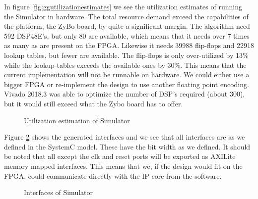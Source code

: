 In figure \ref{fig:ggutilizationestimates} we see the utilization estimates of running the Simulator in hardware. The total resource demand exceed the capabilities of the platform, the ZyBo board, by quite a significant margin. The algorithm need 592 DSP48E's, but only 80 are available, which means that it needs over 7 times as many as are present on the FPGA. Likewise it needs 39988 flip-flops and 22918 lookup tables, but fewer are available. The flip-flops is only over-utilized by 13\% while the lookup-tables exceeds the available ones by 30\%. This means that the current implementation will not be runnable on hardware. We could either use a bigger FPGA or re-implement the design to use another floating point encoding. Vivado 2018.3 was able to optimize the number of DSP's required (about 300), but it would still exceed what the Zybo board has to offer.

\begin{figure}[h!]
	\centering
	\caption{Utilization estimation of Simulator}
	\label{fig:simutilizationestimates}
\end{figure}

Figure \ref{fig:siminterface} shows the generated interfaces and we see that all interfaces are as we defined in the SystemC model. These have the bit width as we defined. It should be noted that all except the clk and reset ports will be exported as AXILite memory mapped interfaces. This means that we, if the design would fit on the FPGA, could communicate directly with the IP core from the software.

\begin{figure}[h!]
	\centering
	\caption{Interfaces of Simulator}
	\label{fig:siminterface}
\end{figure}

